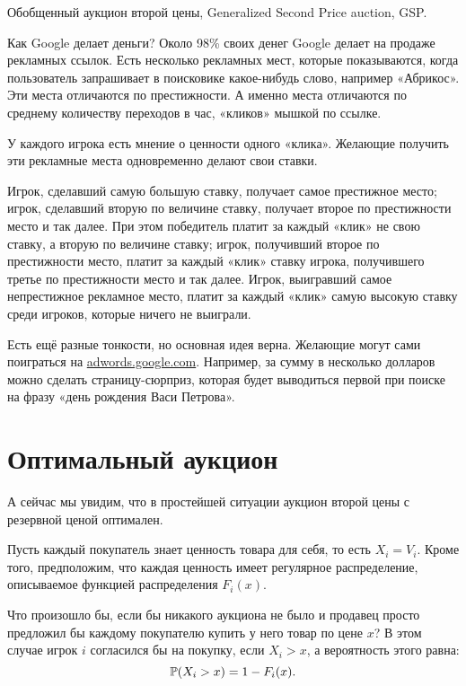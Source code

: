 \begin{myex} Обобщенный аукцион второй цены, Generalized Second Price auction, GSP.

Как Google делает деньги? Около 98\% своих денег Google делает на продаже рекламных ссылок. Есть несколько рекламных мест, которые показываются, когда пользователь запрашивает в поисковике какое-нибудь слово, например «Абрикос». Эти места отличаются по престижности. А именно места отличаются по среднему количеству переходов в час, «кликов» мышкой по ссылке.

У каждого игрока есть мнение о ценности одного «клика». Желающие получить эти рекламные места одновременно делают свои ставки.

Игрок, сделавший самую большую ставку, получает самое престижное место; игрок, сделавший вторую по величине ставку, получает второе по престижности место и так далее.  При этом победитель платит за каждый «клик» не свою ставку, а вторую по величине ставку; игрок, получивший второе по престижности место, платит за каждый «клик» ставку игрока, получившего третье по престижности мес\-то и так далее. Игрок, выигравший самое непрестижное рекламное место, платит за каждый «клик» самую высокую ставку среди игроков, которые ничего не выиграли.

Есть ещё разные тонкости, но основная идея верна. Желающие могут сами поиграться на \url{adwords.google.com}. Например, за сумму в несколько долларов можно сделать страницу-сюрприз, которая будет выводиться первой при поиске на фразу «день рождения Васи Петрова».
\end{myex}





\section{Оптимальный аукцион}

А сейчас мы увидим, что в простейшей ситуации аукцион второй цены с резервной ценой оптимален.

Пусть каждый покупатель знает ценность товара для себя, то есть  $ X_{i}=V_{i} $. Кроме того, предположим, что каждая ценность имеет регулярное распределение, описываемое функцией распределения $ F_{i}(x) $.

Что произошло бы, если бы никакого аукциона не было и продавец просто предложил бы каждому покупателю купить у него товар по цене $ x $? В этом случае игрок $ i $ согласился бы на покупку, если $ X_{i}>x $, а вероятность этого равна:
\begin{equation}
\P(X_{i}>x)=1-F_{i}(x).
\end{equation}

